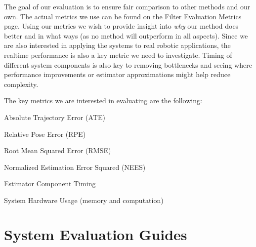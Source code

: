 The goal of our evaluation is to ensure fair comparison to other methods and our own. The actual metrics we use can be found on the \hyperlink{eval-metrics}{Filter Evaluation Metrics} page. Using our metrics we wish to provide insight into {\itshape why} our method does better and in what ways (as no method will outperform in all aspects). Since we are also interested in applying the systems to real robotic applications, the realtime performance is also a key metric we need to investigate. Timing of different system components is also key to removing bottlenecks and seeing where performance improvements or estimator approximations might help reduce complexity.

The key metrics we are interested in evaluating are the following\+:


\begin{DoxyItemize}
\item Absolute Trajectory Error (A\+TE)
\item Relative Pose Error (R\+PE)
\item Root Mean Squared Error (R\+M\+SE)
\item Normalized Estimation Error Squared (N\+E\+ES)
\item Estimator Component Timing
\item System Hardware Usage (memory and computation)
\end{DoxyItemize}\hypertarget{evaluation_evaluation-more}{}\section{System Evaluation Guides}\label{evaluation_evaluation-more}

